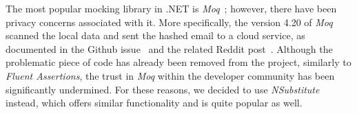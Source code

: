 The most popular mocking library in .NET is \textit{Moq}~\cite{moq}; however, there have been privacy concerns associated with it.
More specifically, the version 4.20 of \textit{Moq} scanned the local data 
and sent the hashed email to a cloud service, as documented in the Github issue~\cite{moq_issue}
and the related Reddit post~\cite{moq_reddit_post}.
Although the problematic piece of code has already been removed from the project, similarly to \textit{Fluent Assertions}, the trust in \textit{Moq} within the developer community has been significantly undermined.
For these reasons, we decided to use \textit{NSubstitute}~\cite{nsub} instead, which offers similar functionality and is quite popular as well.

